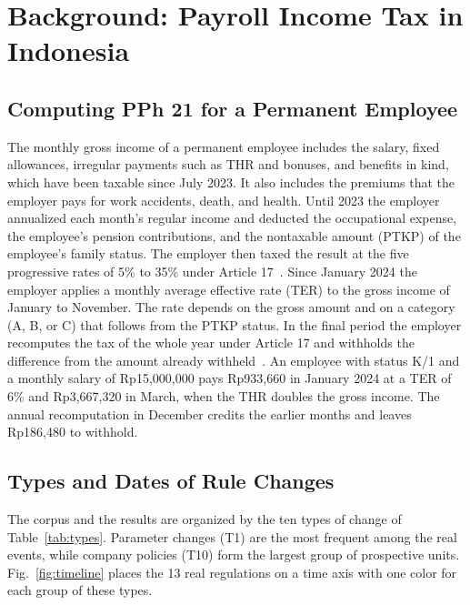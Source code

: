 \section{Background: Payroll Income Tax in Indonesia}
\label{sec:background}
\subsection{Computing PPh 21 for a Permanent Employee}
\label{sec:pph21}
The monthly gross income of a permanent employee includes the salary, fixed allowances, irregular payments such as THR and bonuses, and benefits in kind, which have been taxable since July 2023. It also includes the premiums that the employer pays for work accidents, death, and health. Until 2023 the employer annualized each month's regular income and deducted the occupational expense, the employee's pension contributions, and the nontaxable amount (PTKP) of the employee's family status. The employer then taxed the result at the five progressive rates of 5\% to 35\% under Article 17~\cite{uu7_2021,pmk101_2016,per16_2016}. Since January 2024 the employer applies a monthly average effective rate (TER) to the gross income of January to November. The rate depends on the gross amount and on a category (A, B, or C) that follows from the PTKP status. In the final period the employer recomputes the tax of the whole year under Article 17 and withholds the difference from the amount already withheld~\cite{pp58_2023,pmk168_2023}. An employee with status K/1 and a monthly salary of Rp15,000,000 pays Rp933,660 in January 2024 at a TER of 6\% and Rp3,667,320 in March, when the THR doubles the gross income. The annual recomputation in December credits the earlier months and leaves Rp186,480 to withhold.

\subsection{Types and Dates of Rule Changes}
\label{sec:changes}
The corpus and the results are organized by the ten types of change of Table~\ref{tab:types}. Parameter changes (T1) are the most frequent among the real events, while company policies (T10) form the largest group of prospective units. Fig.~\ref{fig:timeline} places the 13 real regulations on a time axis with one color for each group of these types.

